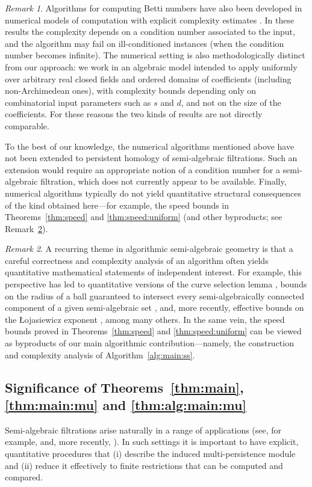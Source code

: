\documentclass{amsart}[10pts]
\theoremstyle{definition}
\theoremstyle{remark}
\newtheorem{remark}{Remark}
\theoremstyle{observation}
\numberwithin{equation}{section}
\begin{document}
\begin{remark}
\label{rem:condition}
Algorithms for computing Betti numbers have also been developed in numerical models of computation with explicit complexity estimates \cite{BCL2019,BCT2020.1,BCT2020.2}. 
In these results the complexity depends on a condition number associated to the input, and the algorithm may fail on ill-conditioned instances (when the condition number becomes infinite). 
The numerical setting is also methodologically distinct from our approach: we work in an algebraic model intended to apply uniformly over arbitrary real closed fields and ordered domains of coefficients (including non-Archimedean ones), with complexity bounds depending only on combinatorial input parameters such as $s$ and $d$, and not on the size of the coefficients. 
For these reasons the two kinds of results are not directly comparable.

\medskip
To the best of our knowledge, the numerical algorithms mentioned above have not been extended to persistent homology of semi-algebraic filtrations. Such an extension would require an appropriate notion of a condition number for a semi-algebraic filtration, which does not currently appear to be available. 
Finally, numerical algorithms typically do not yield quantitative structural consequences of the kind obtained here---for example, the speed bounds in Theorems~\ref{thm:speed} and \ref{thm:speed:uniform} (and other byproducts; see Remark~\ref{rem:byproduct}).
\end{remark}

\begin{remark}
\label{rem:byproduct}
A recurring theme in algorithmic semi-algebraic geometry is that a careful correctness and complexity analysis of an algorithm often yields quantitative mathematical statements of independent interest. 
For example, this perspective has led to quantitative versions of the curve selection lemma \cite{BR2021}, bounds on the radius of a ball guaranteed to intersect every semi-algebraically connected component of a given semi-algebraic set \cite{BR10}, and, more recently, effective bounds on the {\L}ojasiewicz exponent \cite{BN2024}, among many others.
In the same vein, the speed bounds proved in Theorems~\ref{thm:speed} and \ref{thm:speed:uniform} can be viewed as byproducts of our main algorithmic contribution---namely, the construction and complexity analysis of Algorithm~\ref{alg:main:ss}.
\end{remark}


\medskip
\subsection{Significance of Theorems~\ref{thm:main}, \ref{thm:main:mu} and \ref{thm:alg:main:mu}}
\label{subsec:significance:1-2}
Semi-algebraic filtrations arise naturally in a range of applications (see, for example, \cite{Basu-Karisani-2,Miller2015} and, more recently, \cite[Open Questions (ix), p.~433]{AMMW2024}). 
In such settings it is important to have explicit, quantitative procedures that (i) describe the induced multi-persistence module and (ii) reduce it effectively to finite restrictions that can be computed and compared.
\end{document}
